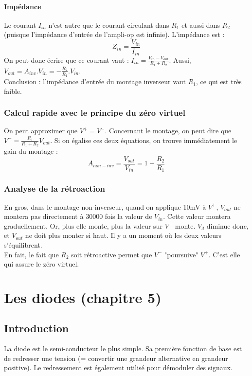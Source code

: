 \documentclass[a4paper]{article}
\begin{document}
    \paragraph{Impédance}
    Le courant $I_{in}$ n'est autre que le courant circulant dans $R_1$ et aussi
    dans $R_2$ (puisque l'impédance d'entrée de l'ampli-op est infinie). L'impédance est :
    $$ Z_{in} = \frac{V_{in}}{I_{in}}$$
    On peut donc écrire que ce courant vaut : $I_{in} = \frac{V_{in} - V_{out}}{R_1+R_2} $.
    Aussi, $V_{out} = A_{inv}.V_{in} = -\frac{R_2}{R_1}.V_{in} $.\\

    Conclusion : l'impédance d'entrée du montage inverseur vaut $R_1$, ce qui est
    très faible.

    \subsubsection{Calcul rapide avec le principe du zéro virtuel}
    On peut approximer que $V^+ = V^-$. Concernant le montage, on peut dire que
    $V^- = \frac{R_1}{R_1+R_2}V_{out}$. Si on égalise ces deux équations, on trouve
    immédiatement le gain du montage : 
    $$ A_{non-inv} = \frac{V_{out}}{V_{in}} = 1 + \frac{R_2}{R_1} $$

    \subsubsection{Analyse de la rétroaction}
    En gros, dans le montage non-inverseur, quand on applique 10mV à $V^+$, 
    $V_{out}$ ne montera pas directement à 30000 fois la valeur de $V_{in}$.
    Cette valeur montera graduellement. Or, plus elle monte, plus la valeur 
    sur $V^-$ monte. $V_d$ diminue donc, et $V_{out}$ ne doit plus monter
    si haut. Il y a un moment où les deux valeurs s'équilibrent.\\

    En fait, le fait que $R_2$ soit rétroactive permet que $V^-$ "poursuive" $V^+$.
    C'est elle qui assure le zéro virtuel.

\section{Les diodes (chapitre 5)}
    
    \subsection{Introduction}
    La diode est le semi-conducteur le plus simple. Sa première fonction de base est de 
    redresser une tension (= convertir une grandeur alternative en grandeur positive).
    Le redressement est également utilisé pour démoduler des signaux.\\
\end{document}
